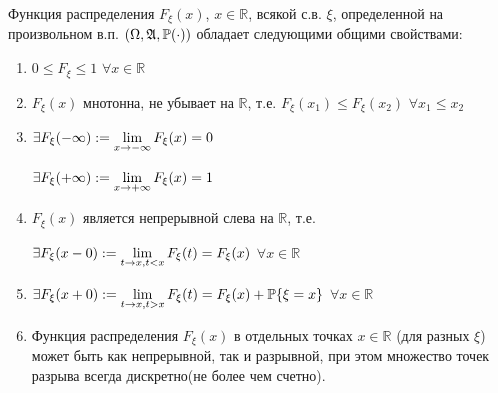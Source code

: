 \begin{proofs}
	Функция распределения $F_{\xi}(x)$, $x \in \mathbb{R}$, всякой с.в. $\xi$, определенной на произвольном в.п.
	$(\Omega, \mathfrak{A}, \mathbb{P}(\cdot))$ обладает следующими общими свойствами:
	\begin{enumerate}
	\item $0 \leq F_{\xi} \leq 1$ $\forall x \in \mathbb{R}$
	\item $F_{\xi}(x)$ мнотонна, не убывает на $\mathbb{R}$, т.е. $F_{\xi}(x_1) \leq F_{\xi}(x_2)$ $\forall x_1 \leq x_2$
	\item
		$\exists F_{\xi}(-\infty) := \lim\limits_{x \to -\infty}F_{\xi}(x) = 0$

		$\exists F_{\xi}(+\infty) := \lim\limits_{x \to +\infty}F_{\xi}(x) = 1$
	\item $F_{\xi}(x)$ является непрерывной слева на $\mathbb{R}$, т.е.

		$\exists F_{\xi}(x-0) := \lim\limits_{t \to x, t < x}F_{\xi}(t) = F_{\xi}(x)$ $\forall x \in \mathbb{R}$
	\item
		$\exists F_{\xi}(x+0) := \lim\limits_{t \to x, t > x}F_{\xi}(t) = F_{\xi}(x) + \mathbb{P}\{\xi = x\}$ $\forall x \in \mathbb{R}$

	\item Функция распределения $F_{\xi}(x)$ в отдельных точках $x \in \mathbb{R}$ (для разных $\xi$) может быть как непрерывной, так и разрывной, при этом
	множество точек разрыва всегда дискретно(не более чем счетно).
	\end{enumerate}
\end{proofs}

